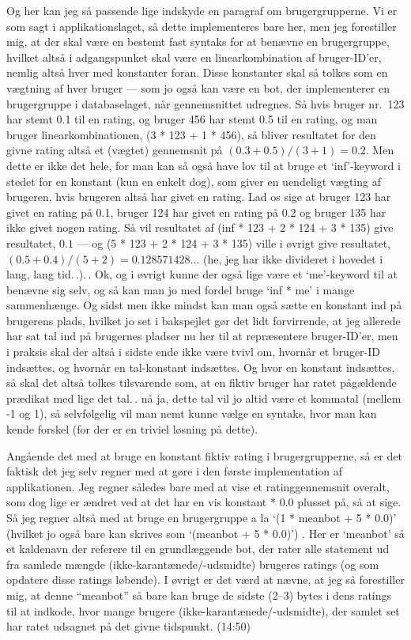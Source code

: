 \documentclass{report}
\begin{document}
Og her kan jeg så passende lige indskyde en paragraf om brugergrupperne. Vi er som sagt i applikationslaget, så dette implementeres bare her, men jeg forestiller mig, at der skal være en bestemt fast syntaks for at benævne en brugergruppe, hvilket altså i adgangspunket skal være en linearkombination af bruger-ID'er, nemlig altså hver med konstanter foran. Disse konstanter skal så tolkes som en vægtning af hver bruger --- som jo også kan være en bot, der implementerer en brugergruppe i databaselaget, når gennemsnittet udregnes. Så hvis bruger nr.\ 123 har stemt 0.1 til en rating, og bruger 456 har stemt 0.5 til en rating, og man bruger linearkombinationen, (3 * 123 + 1 * 456), så bliver resultatet for den givne rating altså et (vægtet) gennemsnit på $(0.3 + 0.5)/(3+1)=0.2$. Men dette er ikke det hele, for man kan så også have lov til at bruge et `inf'-keyword i stedet for en konstant (kun en enkelt dog), som giver en uendeligt vægting af brugeren, hvis brugeren altså har givet en rating. Lad os sige at bruger 123 har givet en rating på 0.1, bruger 124 har givet en rating på 0.2 og bruger 135 har ikke givet nogen rating. Så vil resultatet af (inf * 123 + 2 * 124 + 3 * 135) give resultatet, $0.1$ --- og (5 * 123 + 2 * 124 + 3 * 135) ville i øvrigt give resultatet, $(0.5 + 0.4)/(5+2)=0.128571428\ldots$ (he, jeg har ikke divideret i hovedet i lang, lang tid.\,.).\,. Ok, og i øvrigt kunne der også lige være et `me'-keyword til at benævne sig selv, og så kan man jo med fordel bruge `inf * me' i mange sammenhænge. Og sidst men ikke mindst kan man også sætte en konstant ind på brugerens plads, hvilket jo set i bakspejlet gør det lidt forvirrende, at jeg allerede har sat tal ind på brugernes pladser nu her til at repræsentere bruger-ID'er, men i praksis skal der altså i sidste ende ikke være tvivl om, hvornår et bruger-ID indsættes, og hvornår en tal-konstant indsættes. Og hvor en konstant indsættes, så skal det altså tolkes tilsvarende som, at en fiktiv bruger har ratet pågældende prædikat med lige det tal.\,. nå ja, dette tal vil jo altid være et kommatal (mellem -1 og 1), så selvfølgelig vil man nemt kunne vælge en syntaks, hvor man kan kende forskel (for der er en triviel løsning på dette). 

Angående det med at bruge en konstant fiktiv rating i brugergrupperne, så er det faktisk det jeg selv regner med at gøre i den første implementation af applikationen. Jeg regner således bare med at vise et ratinggennemsnit overalt, som dog lige er ændret ved at det har en vis konstant * 0.0 plusset på, så at sige. Så jeg regner altså med at bruge en brugergruppe a la `(1 * meanbot + 5 * 0.0)' (hvilket jo også bare kan skrives som `(meanbot + 5 * 0.0)') . Her er `meanbot' så et kaldenavn der referere til en grundlæggende bot, der rater alle statement ud fra samlede mængde (ikke-karantænede/-udsmidte) brugeres ratings (og som opdatere disse ratings løbende). 
I øvrigt er det værd at nævne, at jeg så forestiller mig, at denne ``meanbot'' så bare kan bruge de sidste (2--3) bytes i dens ratings til at indkode, hvor mange brugere (ikke-karantænede/-udsmidte), der samlet set har ratet udsagnet på det givne tidspunkt. (14:50)
\end{document}
